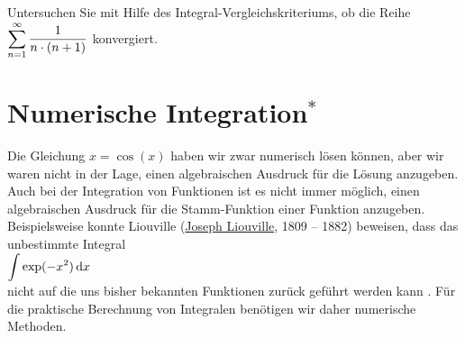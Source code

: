 \exercise
Untersuchen Sie mit Hilfe des Integral-Vergleichskriteriums, ob die
Reihe 
\\[0.2cm]
\hspace*{1.3cm}
$\displaystyle \sum\limits_{n=1}^\infty \frac{1}{n\cdot (n+1)}$ 
\qquad
konvergiert.  \eox


\section{Numerische Integration$^*$}
Die Gleichung $x = \cos(x)$ haben wir zwar numerisch l\"osen k\"onnen, aber wir waren nicht in
der Lage, einen algebraischen Ausdruck f\"ur die L\"osung anzugeben.  Auch bei der Integration
von Funktionen ist es nicht immer m\"oglich, einen algebraischen Ausdruck f\"ur die
Stamm-Funktion einer Funktion anzugeben.  Beispielsweise konnte Liouville 
(\href{https://de.wikipedia.org/wiki/Joseph_Liouville}{Joseph Liouville}, 1809 -- 1882) beweisen, dass das
unbestimmte Integral
\\[0.2cm]
\hspace*{1.3cm}
$\displaystyle\int \exp(-x^2)\, \textrm{d} x$
\\[0.2cm]
nicht auf die uns bisher bekannten Funktionen zur\"uck gef\"uhrt werden kann \cite{rosenlicht:72}.  F\"ur die
praktische Berechnung von Integralen ben\"otigen wir daher numerische Methoden.

